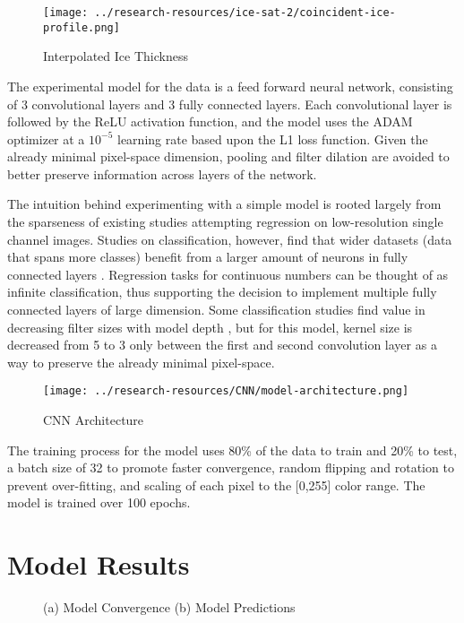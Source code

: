 \begin{figure}[h!]
	\centering
	\texttt{[image: ../research-resources/ice-sat-2/coincident-ice-profile.png]}
	\caption{Interpolated Ice Thickness}
	\label{fig:ice-thickness-interpolation}
\end{figure}

The experimental model for the data is a feed forward neural network, consisting of 3 convolutional layers and 3 fully connected layers. Each convolutional layer is followed by the ReLU activation function, and the model uses the ADAM optimizer at a $10^{-5}$ learning rate based upon the L1 loss function. Given the already minimal pixel-space dimension, pooling and filter dilation are avoided to better preserve information across layers of the network.

The intuition behind experimenting with a simple model is rooted largely from the sparseness of existing studies attempting regression on low-resolution single channel images. Studies on classification, however, find that wider datasets (data that spans more classes) benefit from a larger amount of neurons in fully connected layers \cite{BASHA2020112}. Regression tasks for continuous numbers can be thought of as infinite classification, thus supporting the decision to implement multiple fully connected layers of large dimension. Some classification studies find value in decreasing filter sizes with model depth \cite{ganj2023lrnet}, but for this model, kernel size is decreased from 5 to 3 only between the first and second convolution layer as a way to preserve the already minimal pixel-space.

\begin{figure}
  \centering
  \texttt{[image: ../research-resources/CNN/model-architecture.png]}
	\caption{CNN Architecture}
	\label{fig:cnn-model}
\end{figure}

The training process for the model uses 80\% of the data to train and 20\% to test, a batch size of 32 to promote faster convergence, random flipping and rotation to prevent over-fitting, and scaling of each pixel to the [0,255] color range. The model is trained over 100 epochs.


\section{Model Results}

\begin{figure}[hbt!]
	\centering
	\caption[Model Performance]{(a) Model Convergence (b) Model Predictions}
	\label{fig:model-results}
\end{figure}

